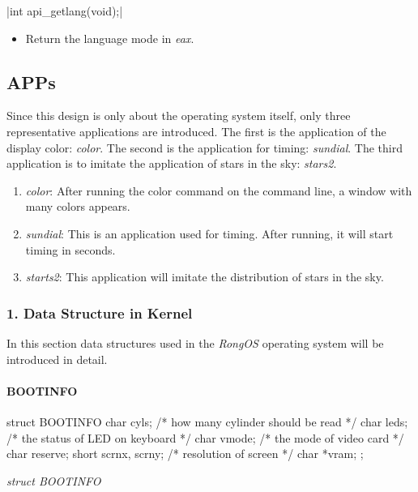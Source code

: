 \documentclass{swfcthesis}
\begin{document}
\csingle|int api_getlang(void);|
\begin{itemize}
\item Return the language mode in \emph{eax}.
\end{itemize}

\subsection{APPs}
\label{sec:apps-1}
Since this design is only about the operating system itself, only three representative
applications are introduced. The first is the application of the display color:
\emph{color}. The second is the application for timing: \emph{sundial}. The third
application is to imitate the application of stars in the sky: \emph{stars2}.

\begin{enumerate}
\item \emph{color}: After running the color command on the command line, a window with
  many colors appears.
\item \emph{sundial}: This is an application used for timing. After running, it will start
  timing in seconds.
\item \emph{starts2}: This application will imitate the distribution of stars in the sky.
  
\end{enumerate}

\iffalse %
\subsubsection{1. Data Structure in Kernel}
In this section data structures used in the \emph{RongOS} operating system will be introduced in
detail.

\paragraph{BOOTINFO}

\begin{listing}[H]
  \begin{codeblock}
\begin{ccode}
struct BOOTINFO
{
  char cyls;          /* how many cylinder should be read */
  char leds;          /* the status of LED on keyboard */
  char vmode;         /* the mode of video card */
  char reserve;
  short scrnx, scrny; /* resolution of screen */
  char *vram;
};
\end{ccode}
  \end{codeblock}
  \caption{\emph{struct BOOTINFO}}\label{src:bootinfo}
\end{listing}
\end{document}
